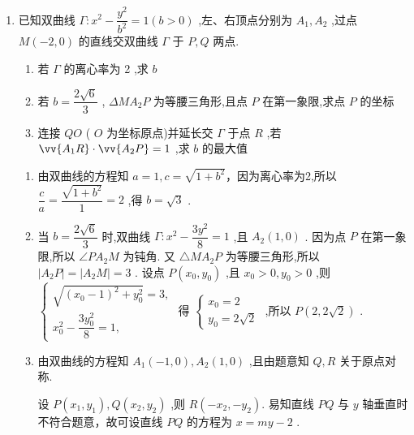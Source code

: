 \begin{enumerate}
        \item 已知双曲线 $\Gamma  : {x}^{2} - \dfrac{{y}^{2}}{{b}^{2}} = 1\left( {b > 0}\right)$ ,左、右顶点分别为 ${A}_{1},{A}_{2}$ ,过点 $M\left( {-2,0}\right)$ 的直线交双曲线 $\Gamma$ 于 $P,Q$ 两点.
    \begin{enumerate}
        \item 若 $\Gamma$ 的离心率为 2 ,求 $b$
        \item 若 $b = \dfrac{2\sqrt{6}}{3}$ , ${\Delta M}{A}_{2}P$ 为等腰三角形,且点 $P$ 在第一象限,求点 $P$ 的坐标
        \item 连接 ${QO}$ ( $O$ 为坐标原点)并延长交 $\Gamma$ 于点 $R$ ,若 $\vv{{A}_{1}R} \cdot  \vv{{A}_{2}P} = 1$ ,求 $b$ 的最大值
    \end{enumerate}
    \begin{jieda}
        \begin{enumerate}
            \item 由双曲线的方程知 $a = 1,c = \sqrt{1 + {b}^{2}}$，因为离心率为2,所以 $\dfrac{c}{a} = \dfrac{\sqrt{1 + {b}^{2}}}{1} = 2$ ,得 $b = \sqrt{3}$ .
            \item 当 $b = \dfrac{2\sqrt{6}}{3}$ 时,双曲线 $\Gamma  : {x}^{2} - \dfrac{3{y}^{2}}{8} = 1$ ,且 ${A}_{2}\left( {1,0}\right)$ .
            因为点 $P$ 在第一象限,所以 $\angle P{A}_{2}M$ 为钝角.
            又 ${\triangle M}{A}_{2}P$ 为等腰三角形,所以 $\left| {{A}_{2}P}\right|  = \left| {{A}_{2}M}\right|  = 3$ .
            设点 $P\left( {{x}_{0},{y}_{0}}\right)$ ,且 ${x}_{0} > 0,{y}_{0} > 0$ ,则 $\left\{  \begin{matrix} \sqrt{{\left( {x}_{0} - 1\right) }^{2} + {y}_{0}^{2}} = 3, \\  {x}_{0}^{2} - \dfrac{3{y}_{0}^{2}}{8} = 1, \end{matrix}\right.$
            得 $\left\{  \begin{matrix} {x}_{0} = 2 \\  {y}_{0} = 2\sqrt{2} \end{matrix}\right.$ ,所以 $P\left( {2,2\sqrt{2}}\right)$ .
            
            \item 由双曲线的方程知 ${A}_{1}\left( {-1,0}\right) ,{A}_{2}\left( {1,0}\right)$ ,且由题意知 $Q,R$ 关于原点对称.
            
            设 $P\left( {{x}_{1},{y}_{1}}\right) ,Q\left( {{x}_{2},{y}_{2}}\right)$ ,则 $R\left( {-{x}_{2}, - {y}_{2}}\right)$. 易知直线 ${PQ}$ 与 $y$ 轴垂直时不符合题意，故可设直线 ${PQ}$ 的方程为 $x = {my} - 2$ .


\end{enumerate}
\end{jieda}
\end{enumerate}
